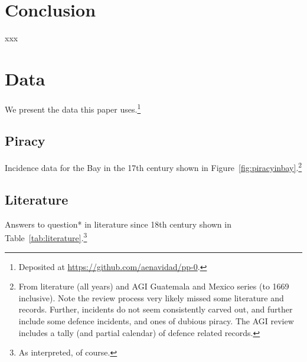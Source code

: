 \documentclass{amsart}
\theoremstyle{definition}
\theoremstyle{remark}
\begin{document}
\section{Conclusion}
\label{s:concl}
	xxx 
%
%
%
\section{Data}
\label{s:data}
	We present the data this paper uses.\footnote{Deposited at \url{https://github.com/aenavidad/pp-0}.}
	\subsection{Piracy}
	\label{ss:datapiracy}
	Incidence data for the Bay in the 17th century shown in Figure~\ref{fig:piracyinbay}.\footnote{From literature (all years) and AGI Guatemala and Mexico series (to 1669 inclusive). Note the review process very likely missed some literature and records. Further, incidents do not seem consistently carved out, and further include some defence incidents, and ones of dubious piracy. The AGI review includes a tally (and partial calendar) of defence related records.}
	\subsection{Literature}
	\label{ss:dataliterature}
	Answers to question* in literature since 18th century shown in Table~\ref{tab:literature}.\footnote{As interpreted, of course.}
%
%
%
%
\begin{bibdiv}
\label{s:references}
	\begin{biblist}
	\end{biblist}
\end{bibdiv}
%
%
%
\end{document}
